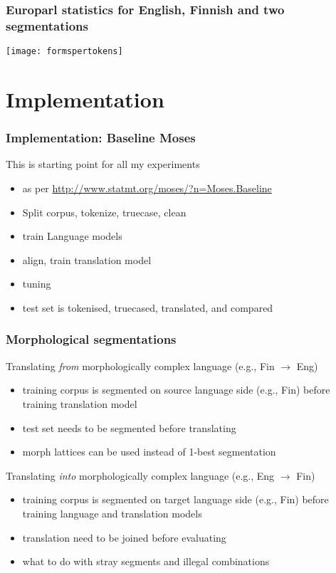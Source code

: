\documentclass{beamer}
\begin{document}
\begin{frame}
    \frametitle{Europarl statistics for English, Finnish and two segmentations}
    \texttt{[image: formspertokens]}
\end{frame}

\section{Implementation}

\begin{frame}
    \frametitle{Implementation: Baseline Moses}
    This is starting point for all my experiments
    \begin{itemize}
        \item as per \url{http://www.statmt.org/moses/?n=Moses.Baseline}
        \item Split corpus, tokenize, truecase, clean
        \item train Language models
        \item align, train translation model
        \item tuning
        \item test set is tokenised, truecased, translated, and compared
    \end{itemize}
\end{frame}

\begin{frame}
    \frametitle{Morphological segmentations}
Translating \emph{from} morphologically complex language (e.g., Fin $\rightarrow$ Eng)
    \begin{itemize}
        \item training corpus is segmented on source language side (e.g., Fin)
            before training translation model
        \item test set needs to be segmented before translating
        \item morph lattices can be used instead of 1-best segmentation
    \end{itemize}
    Translating \emph{into} morphologically complex language (e.g., Eng $\rightarrow$ Fin)
    \begin{itemize}
        \item training corpus is segmented on target language side (e.g., Fin)
            before training language and translation models 
        \item translation need to be joined before evaluating
        \item what to do with stray segments and illegal combinations
    \end{itemize}
\end{frame}
\end{document}
